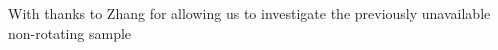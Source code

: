 %
%
%
%
%
%
%





With thanks to Zhang for allowing us to investigate the previously unavailable non-rotating sample








